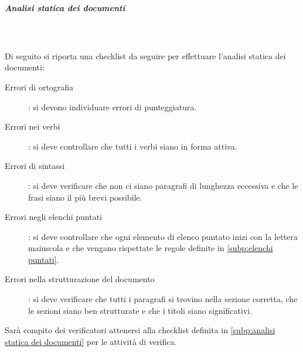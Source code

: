\documentclass[../norme-di-progetto.tex]{subfiles}
\begin{document}
\subparagraph{Analisi statica dei documenti}\mbox{}\\
\label{subp:analisi statica dei documenti}
\\ Di seguito si riporta una checklist da seguire per effettuare l'analisi statica dei documenti:
\begin{description}
    \item [Errori di ortografia]: si devono individuare errori di punteggiatura.
    \item [Errori nei verbi]: si deve controllare che tutti i verbi siano in forma attiva.
    \item [Errori di sintassi]: si deve verificare che non ci siano paragrafi di lunghezza eccessiva e che le frasi siano il più brevi possibile.
    \item [Errori negli elenchi puntati]: si deve controllare che ogni elemento di elenco puntato inizi con la lettera maiuscola e che vengano rispettate le regole definite in \ref{subp:elenchi puntati}.
    \item [Errori nella strutturazione del documento]: si deve verificare che tutti i paragrafi si trovino nella sezione corretta, che le sezioni siano ben strutturate e che i titoli siano significativi.
\end{description}
Sarà compito dei verificatori attenersi alla checklist definita in \ref{subp:analisi statica dei documenti} per le attività di verifica.
\end{document}
